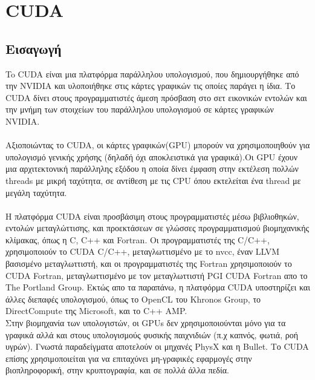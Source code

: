 \section{CUDA}
\subsection{Εισαγωγή}
To CUDA είναι μια πλατφόρμα παράλληλου υπολογισμού, που δημιουργήθηκε από την NVIDIA και υλοποιήθηκε στις κάρτες γραφικών τις οποίες παράγει η ίδια. Το CUDA δίνει στους προγραμματιστές άμεση πρόσβαση στο σετ εικονικών εντολών και την μνήμη των στοιχείων του παράλληλου υπολογισμού σε κάρτες γραφικών NVIDIA. \\
\\
Αξιοποιώντας το CUDA, οι κάρτες γραφικών(GPU) μπορούν να χρησιμοποιηθούν για υπολογισμό γενικής χρήσης (δηλαδή όχι αποκλειστικά για γραφικά).Οι GPU έχουν μια αρχιτεκτονική παράλληλης εξόδου η οποία δίνει έμφαση στην εκτέλεση πολλών threads με μικρή ταχύτητα, σε αντίθεση με τις CPU όπου εκτελείται ένα thread με μεγάλη ταχύτητα. \\
\\
Η πλατφόρμα CUDA είναι προσβάσιμη στους προγραμματιστές μέσω βιβλιοθηκών, εντολών μεταγλώττισης, και προεκτάσεων σε γλώσσες προγραμματισμού βιομηχανικής κλίμακας, όπως η C, C++ και Fortran. Οι προγραμματιστές της C/C++, χρησιμοποιούν το CUDA C/C++, μεταγλωττισμένο με το nvcc, έναν LLVM βασισμένο μεταγλωττιστή, και οι προγραμματιστές της Fortran χρησιμοποιούν το CUDA Fortran, μεταγλωττισμένο με τον μεταγλωττιστή PGI CUDA Fortran απο το The Portland Group. Εκτώς απο τα παραπάνω, η πλατφόρμα CUDA υποστηρίζει και άλλες διεπαφές υπολογισμού, όπως το OpenCL του Khronos Group, το DirectCompute της Microsoft, και το C++ AMP.\\
Στην βιομηχανία των υπολογιστών, οι GPUs δεν χρησιμοποιούνται μόνο για τα γραφικά αλλά και στους υπολογισμούς φυσικής παιχνιδιών (π.χ καπνός, φωτιά, ροή υγρών). Γνωστά παραδείγματα αποτελούν οι μηχανές PhysX και η Bullet. Το CUDA επίσης χρησιμοποιείται για να επιταχύνει μη-γραφικές εφαρμογές στην βιοπληροφορική, στην κρυπτογραφία, και σε πολλά άλλα πεδία.\\

